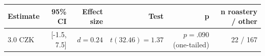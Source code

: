 \begin{tabular}{lrrrrr}
\toprule
Estimate & 95\% CI & Effect size & Test & p & n roastery / other \\
\midrule
3.0 CZK & [-1.5, 7.5] & $d=0.24$ & $t(32.46)=1.37$ & $p=.090$ (one-tailed) & 22 / 167 \\
\bottomrule
\end{tabular}
